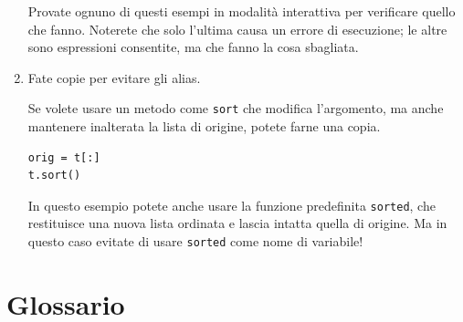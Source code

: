 \documentclass[10pt]{book}
\begin{document}
\begin{enumerate}
Provate ognuno di questi esempi in modalità interattiva per verificare quello che fanno. Noterete che solo l'ultima causa un errore di esecuzione; le altre sono espressioni consentite, ma che fanno la cosa sbagliata.


\item Fate copie per evitare gli alias.

Se volete usare un metodo come {\tt sort} che modifica l'argomento, ma anche mantenere inalterata la lista di origine, potete farne una copia.

\begin{verbatim}
orig = t[:]
t.sort()
\end{verbatim}

In questo esempio potete anche usare la funzione predefinita {\tt sorted},
che restituisce una nuova lista ordinata e lascia intatta quella di origine. Ma in questo caso evitate di usare {\tt sorted} come nome di variabile!

\end{enumerate}



\section{Glossario}
\end{document}
